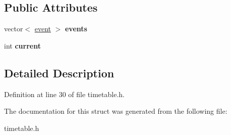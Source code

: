 \subsection*{Public Attributes}
\begin{DoxyCompactItemize}
\item 
\mbox{\label{structtimeTable_acf9d92d0c3b773312ee18e4df1c4ef24}} 
vector$<$ \mbox{\hyperlink{structevent}{event}} $>$ {\bfseries events}
\item 
\mbox{\label{structtimeTable_a23a883cdef1355fe2b074ac738f432cf}} 
int {\bfseries current}
\end{DoxyCompactItemize}


\subsection{Detailed Description}


Definition at line 30 of file timetable.\+h.



The documentation for this struct was generated from the following file\+:\begin{DoxyCompactItemize}
\item 
timetable.\+h\end{DoxyCompactItemize}
